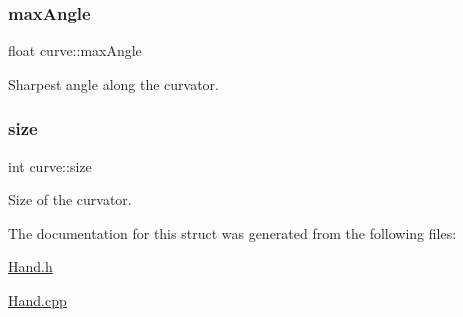 \hypertarget{structcurve_ae5ccde75e194081b8c4b0c00f7af4879}{}\label{structcurve_ae5ccde75e194081b8c4b0c00f7af4879} 
\subsubsection{\texorpdfstring{max\+Angle}{maxAngle}}
{\footnotesize\ttfamily float curve\+::max\+Angle}



Sharpest angle along the curvator. 

\hypertarget{structcurve_a6a90092a2b62540ae3993cdb469f8451}{}\label{structcurve_a6a90092a2b62540ae3993cdb469f8451} 
\subsubsection{\texorpdfstring{size}{size}}
{\footnotesize\ttfamily int curve\+::size}



Size of the curvator. 



The documentation for this struct was generated from the following files\+:\begin{DoxyCompactItemize}
\item 
\hyperlink{_hand_8h}{Hand.\+h}\item 
\hyperlink{_hand_8cpp}{Hand.\+cpp}\end{DoxyCompactItemize}
